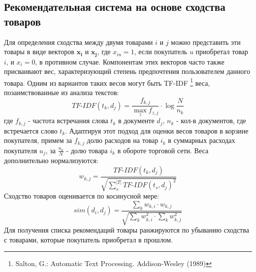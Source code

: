 \documentclass{article}
\begin{document}
\subsection{Рекомендательная система на основе сходства товаров}
\newcommand{\tfidf}{\ensuremath{\textit{TF-IDF}}}
Для определения сходства между двумя товарами $i$ и $j$ можно представить эти товары в виде векторов $\mathbf{x_i}$ и $\mathbf{x_j}$, где $x_{iu} = 1$, если покупатель $u$ приобретал товар $i$, и $x_i = 0$, в противном случае. Компонентам этих векторов часто также присваивают вес, характеризующий степень предпочтения пользователем данного товара. Одним из вариантов таких весов могут быть TF-IDF \footnote{Salton, G.: Automatic Text Processing. Addison-Wesley (1989)} веса, позаимствованные из анализа текстов:
\begin{equation}
\tfidf (t_k, d_j) = \frac{f_{k, j}}{\max_z f_{z,j} } \cdot \log \frac{N}{n_k}
\end{equation}
где $f_{k,j}$ - частота встречания слова $t_k$ в документе $d_j$, $n_k$ - кол-в документов, где встречается слово $t_k$. Адаптируя этот подход для оценки весов товаров в корзине покупателя, примем за $f_{k,j}$ долю расходов на товар $i_k$ в суммарных расходах покупателя $u_j$, за $\frac{n_k}{N}$ - долю товара $i_k$ в обороте торговой сети. Веса дополнительно нормализуются:
\begin{equation}
w_{k,j} = \frac{\tfidf (t_k, d_j)}{\sqrt{\sum_s^{|T|}\tfidf (t_s, d_j)^2}}
\end{equation}
Сходство товаров оценивается по косинусной мере:
\begin{equation}
sim(d_i, d_j) = \frac{\sum_k w_{k, i} \cdot w_{k, j}}{ \sqrt{\sum_k w_{k, i}^2 \cdot \sum_k w_{k, j}^2}}
\end{equation}
Для получения списка рекомендаций товары ранжируются по убыванию сходства с товарами, которые покупатель приобретал в прошлом.

\end{document}
